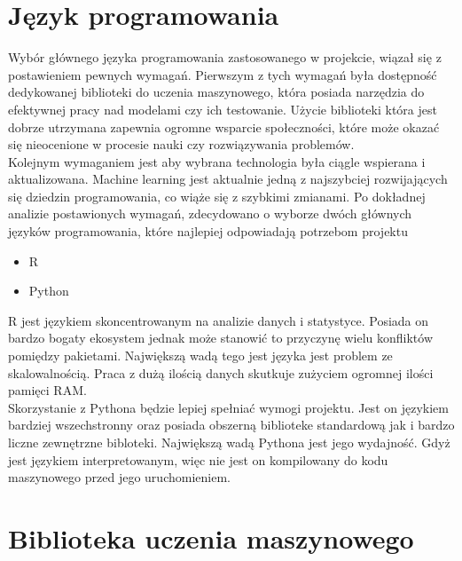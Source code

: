 \documentclass[a4paper,twoside,12pt]{book}
\begin{document}
\section{Język programowania}
Wybór głównego języka programowania zastosowanego w projekcie, wiązał się z postawieniem pewnych wymagań. Pierwszym z tych wymagań była dostępność dedykowanej biblioteki do uczenia maszynowego, która posiada narzędzia do efektywnej pracy nad modelami czy ich testowanie. Użycie biblioteki która jest dobrze utrzymana zapewnia ogromne wsparcie społeczności, które może okazać się nieocenione w procesie nauki czy rozwiązywania problemów.\\Kolejnym wymaganiem jest aby wybrana technologia była ciągle wspierana i aktualizowana. Machine learning jest aktualnie jedną z najszybciej rozwijających się dziedzin programowania, co wiąże się z szybkimi zmianami. Po dokładnej analizie postawionych wymagań, zdecydowano o wyborze dwóch głównych języków programowania, które najlepiej odpowiadają potrzebom projektu
\begin{itemize}
  \item R
  \item Python
\end{itemize}

R jest językiem skoncentrowanym na analizie danych i statystyce. Posiada on bardzo bogaty ekosystem jednak może stanowić to przyczynę wielu konfliktów pomiędzy pakietami. Największą wadą tego jest języka jest problem ze skalowalnością. Praca z dużą ilością danych skutkuje zużyciem ogromnej ilości pamięci RAM.\\ Skorzystanie z Pythona będzie lepiej spełniać wymogi projektu. Jest on językiem bardziej wszechstronny oraz posiada obszerną biblioteke standardową jak i bardzo liczne zewnętrzne bibloteki. Największą wadą Pythona jest jego wydajność. Gdyż jest językiem interpretowanym, więc nie jest on kompilowany do kodu maszynowego przed jego uruchomieniem.
\section{Biblioteka uczenia maszynowego}
\end{document}
